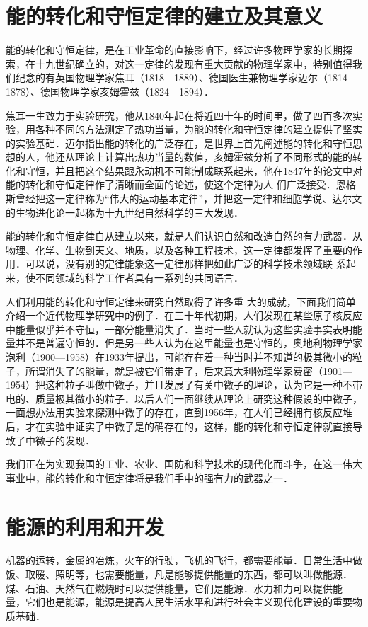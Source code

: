 \section{能的转化和守恒定律的建立及其意义}
能的转化和守恒定律，是在工业革命的直接影响下，经过许多物理学家的长期探索，在十九世纪确立的，对这一定律的发现有重大贡献的物理学家中，特别值得我们纪念的有英国物理学家焦耳（1818—1889）、德国医生兼物理学家迈尔（1814—1878）、德国物理学家亥姆霍兹（1824—1894）．

焦耳一生致力于实验研究，他从1840年起在将近四十年的时间里，做了四百多次实验，用各种不同的方法测定了热功当量，为能的转化和守恒定律的建立提供了坚实的实验基础．迈尔指出能的转化的广泛存在，是世界上首先阐述能的转化和守恒思想的人，他还从理论上计算出热功当量的数值，亥姆霍兹分析了不同形式的能的转化和守恒，并且把这个结果跟永动机不可能制成联系起来，他在1847年的论文中对能的转化和守恒定律作了清晰而全面的论述，使这个定律为人
们广泛接受．恩格斯曾经把这一定律称为“伟大的运动基本定律”，并把这一定律和细胞学说、达尔文的生物进化论一起称为十九世纪自然科学的三大发现．

能的转化和守恒定律自从建立以来，就是人们认识自然和改造自然的有力武器．从物理、化学、生物到天文、地质，以及各种工程技术，这一定律都发挥了重要的作用．可以说，没有别的定律能象这一定律那样把如此广泛的科学技术领域联
系起来，使不同领域的科学工作者具有一系列的共同语言．

人们利用能的转化和守恒定律来研究自然取得了许多重
大的成就，下面我们简单介绍一个近代物理学研究中的例子．在三十年代初期，人们发现在某些原子核反应中能量似乎并不守恒，一部分能量消失了．当时一些人就认为这些实验事实表明能量并不是普遍守恒的．但是另一些人认为在这里能量也是守恒的，奥地利物理学家泡利（1900—1958）在1933年提出，可能存在着一种当时并不知道的极其微小的粒子，所谓消失了的能量，就是被它们带走了，后来意大利物理学家费密（1901—1954）把这种粒子叫做中微子，并且发展了有关中微子的理论，认为它是一种不带电的、质量极其微小的粒子．以后人们一面继续从理论上研究这种假设的中微子，一面想办法用实验来探测中微子的存在，直到1956年，在人们已经拥有核反应堆后，才在实验中证实了中微子是的确存在的，这样，能的转化和守恒定律就直接导致了中微子的发现．

我们正在为实现我国的工业、农业、国防和科学技术的现代化而斗争，在这一伟大事业中，能的转化和守恒定律将是我们手中的强有力的武器之一．

\section{能源的利用和开发}
机器的运转，金属的冶炼，火车的行驶，飞机的飞行，都需要能量．日常生活中做饭、取暖、照明等，也需要能量，凡是能够提供能量的东西，都可以叫做能源．煤、石油、天然气在燃烧时可以提供能量，它们是能源．水力和力可以提供能
量，它们也是能源，能源是提高人民生活水平和进行社会主义现代化建设的重要物质基础．

